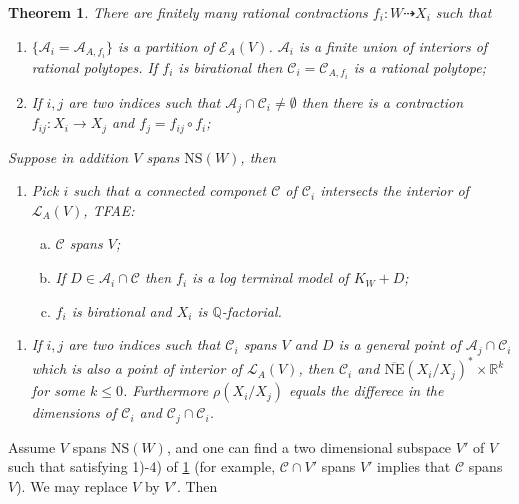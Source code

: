 \documentclass{article}
\newtheorem{thm}[defn]{Theorem}
\begin{document}
\begin{thm}\label{finite ample models}
	There are finitely many rational contractions $ f_i:W\dashrightarrow X_i $ such that
	\begin{enumerate}[1)]
		\item $ \{\mathcal{A}_i=\mathcal{A}_{A,f_i}\} $ is a partition of $ \mathcal{E}_{A}(V) $. $ \mathcal{A}_i $ is a finite union of interiors of rational polytopes. If $ f_i $ is birational then $ \mathcal{C}_i=\mathcal{C}_{A,f_i} $ is a rational polytope;
		\item If $ i,j $ are two indices such that $ \mathcal{A}_j\cap \mathcal{C}_i\neq \emptyset $ then there is a contraction $ f_{ij}:X_i\to X_j $ and $ f_j=f_{ij}\circ f_i $;
	\end{enumerate}
	Suppose in addition $ V $ spans $ \mathrm{NS}(W) $, then
	\begin{enumerate}[3)]
		\item Pick $ i $ such that a connected componet $ \mathcal{C} $ of $ \mathcal{C}_i $ intersects the interior of $ \mathcal{L}_A(V) $, TFAE:
		\begin{enumerate}[a)]
			\item $ \mathcal{C} $ spans $ V $;
			\item If $ D\in \mathcal{A}_i\cap \mathcal{C} $ then $ f_i $ is a log terminal model of $ K_W+D $;
			\item $ f_i $ is birational and $ X_i $ is $ \mathbb{Q} $-factorial.
		\end{enumerate}
	\end{enumerate}
	\begin{enumerate}[4)]
		\item If $ i,j $ are two indices such that $ \mathcal{C}_i $ spans $ V $ and $ D $ is a general point of $ \mathcal{A}_j\cap \mathcal{C}_i $ which is also a point of interior of $ \mathcal{L}_A(V) $, then $ \mathcal{C}_i $ and $ \overline{\mathrm{NE}}(X_i/X_j)^*\times \mathbb{R}^k $ for some $ k\leqslant 0 $. Furthermore $ \rho(X_i/X_j) $ equals the differece in the dimensions of $ \mathcal{C}_i $ and $ \mathcal{C}_j\cap \mathcal{C}_i $.
	\end{enumerate}
\end{thm}
Assume $ V $ spans $ \mathrm{NS}(W) $, and one can find a two dimensional subspace $ V' $ of $ V $ such that satisfying 1)-4) of \ref{finite ample models} (for example, $ \mathcal{C}\cap V' $ spans $ V' $ implies that $ \mathcal{C} $ spans $ V $). We may replace $ V $ by $ V' $. Then 
\end{document}
